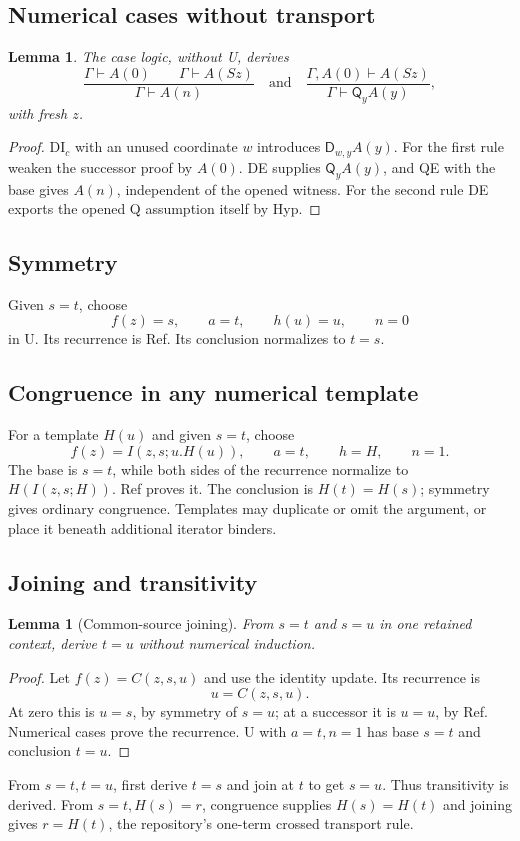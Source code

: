 \documentclass[11pt]{article}
\newtheorem{lemma}[theorem]{Lemma}
\newcommand{\Q}{\mathsf Q}\newcommand{\D}{\mathsf D}
\begin{document}
\subsection{Numerical cases without transport}
\begin{lemma}
The case logic, without U, derives
\[
 \frac{\Gamma\vdash A(0)\qquad\Gamma\vdash A(Sz)}
      {\Gamma\vdash A(n)}
 \quad\text{and}\quad
 \frac{\Gamma,A(0)\vdash A(Sz)}
      {\Gamma\vdash\Q_yA(y)},                          \tag{Cases}\label{eq:cases}
\]
with fresh $z$.
\end{lemma}
\begin{proof}
DI$_c$ with an unused coordinate $w$ introduces $\D_{w,y}A(y)$.
For the first rule weaken the successor proof by $A(0)$.
DE supplies $\Q_yA(y)$, and QE with the base gives $A(n)$,
independent of the opened witness. For the second rule DE exports the
opened Q assumption itself by Hyp.
\end{proof}

\subsection{Symmetry}
Given $s=t$, choose
\[
 f(z)=s,\qquad a=t,\qquad h(u)=u,\qquad n=0
\]
in U. Its recurrence is Ref. Its conclusion normalizes to $t=s$.

\subsection{Congruence in any numerical template}
For a template $H(u)$ and given $s=t$, choose
\[
 f(z)=I(z,s;u.H(u)),\qquad a=t,\qquad h=H,\qquad n=1.
\]
The base is $s=t$, while both sides of the recurrence normalize to
$H(I(z,s;H))$. Ref proves it. The conclusion is $H(t)=H(s)$;
symmetry gives ordinary congruence. Templates may duplicate or omit
the argument, or place it beneath additional iterator binders.

\subsection{Joining and transitivity}
\begin{lemma}[Common-source joining]
From $s=t$ and $s=u$ in one retained context, derive $t=u$ without
numerical induction.
\end{lemma}
\begin{proof}
Let $f(z)=C(z,s,u)$ and use the identity update. Its recurrence is
\[
 u=C(z,s,u).
\]
At zero this is $u=s$, by symmetry of $s=u$; at a successor it is
$u=u$, by Ref. Numerical cases prove the recurrence.
U with $a=t,n=1$ has base $s=t$ and conclusion $t=u$.
\end{proof}
From $s=t,t=u$, first derive $t=s$ and join at $t$ to get $s=u$.
Thus transitivity is derived. From $s=t,H(s)=r$, congruence supplies
$H(s)=H(t)$ and joining gives $r=H(t)$, the repository's one-term
crossed transport rule.
\end{document}

